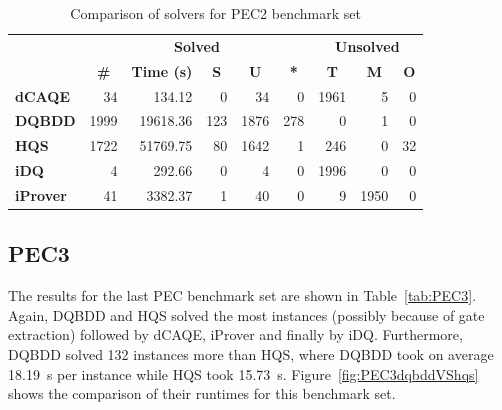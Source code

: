 \documentclass[
  digital, %
  color,
  twoside, %
  table,   %
  nolof,     %
  nolot,     %
]{fithesis3}
\theoremstyle{definition}
\theoremstyle{remark}
\begin{document}
\begin{table}[ht]
\centering
\caption{Comparison of solvers for PEC2 benchmark set}%
\label{tab:PEC2}
\begin{tabular}{|l|r|r|r|r|r|r|r|r|}
\hline
\multicolumn{1}{|c|}{}                                  & \multicolumn{5}{c|}{\textbf{Solved}}                                                                                                                                        & \multicolumn{3}{c|}{\textbf{Unsolved}}                                                                 \\  \hhline{~*{8}{-}}
\multicolumn{1}{|c|}{\multirow{-2}{*}{\textbf{Solver}}} & \multicolumn{1}{c|}{\textbf{\#}} & \multicolumn{1}{c|}{\textbf{Time (s)}} & \multicolumn{1}{c|}{\textbf{S}} & \multicolumn{1}{c|}{\textbf{U}} & \multicolumn{1}{c|}{\textbf{*}} & \multicolumn{1}{c|}{\textbf{T}} & \multicolumn{1}{c|}{\textbf{M}} & \multicolumn{1}{c|}{\textbf{O}} \\ \hline
\textbf{dCAQE} & \num{34} & \num{134.12} & \num{0} & \num{34} & \num{0} & \num{1961} & \num{5} & \num{0} \\ \hline
\textbf{DQBDD} & \num{1999} & \num{19618.36} & \num{123} & \num{1876} & \num{278} & \num{0} & \num{1} & \num{0} \\ \hline
\textbf{HQS} & \num{1722} & \num{51769.75} & \num{80} & \num{1642} & \num{1} & \num{246} & \num{0} & \num{32} \\ \hline
\textbf{iDQ} & \num{4} & \num{292.66} & \num{0} & \num{4} & \num{0} & \num{1996} & \num{0} & \num{0} \\ \hline
\textbf{iProver} & \num{41} & \num{3382.37} & \num{1} & \num{40} & \num{0} & \num{9} & \num{1950} & \num{0} \\ \hline
\end{tabular}
\end{table}

\subsection{PEC3}
The results for the last PEC benchmark set are shown in Table~\ref{tab:PEC3}. Again, DQBDD and HQS solved the most instances (possibly because of gate extraction) followed by dCAQE, iProver and finally by iDQ. Furthermore, DQBDD solved \num{132} instances more than HQS, where DQBDD took on average \SI{18.19}{s} per instance while HQS took \SI{15.73}{s}. Figure~\ref{fig:PEC3dqbddVShqs} shows the comparison of their runtimes for this benchmark set.
\end{document}
